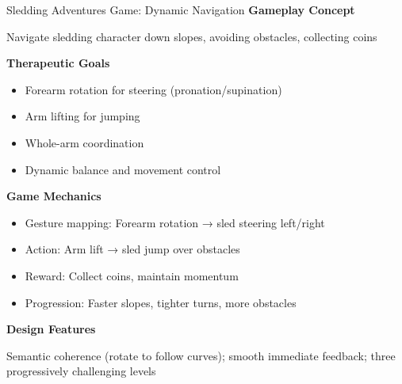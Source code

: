 \begin{frame}{Sledding Adventures Game: Dynamic Navigation}
	\textbf{\textcolor{gbAqua}{Gameplay Concept}}
	
	Navigate sledding character down slopes, avoiding obstacles, collecting coins
	
	\vspace{0.2cm}
	
	\textbf{\textcolor{gbAqua}{Therapeutic Goals}}
	
	\begin{itemize}
		\item Forearm rotation for steering (pronation/supination)
		\item Arm lifting for jumping
		\item Whole-arm coordination
		\item Dynamic balance and movement control
	\end{itemize}
	
	\vspace{0.2cm}
	
	\textbf{\textcolor{gbAqua}{Game Mechanics}}
	
	\begin{itemize}
		\item Gesture mapping: Forearm rotation → sled steering left/right
		\item Action: Arm lift → sled jump over obstacles
		\item Reward: Collect coins, maintain momentum
		\item Progression: Faster slopes, tighter turns, more obstacles
	\end{itemize}
	
	\vspace{0.2cm}
	
	\textbf{\textcolor{gbAqua}{Design Features}}
	
	Semantic coherence (rotate to follow curves); smooth immediate feedback; three progressively challenging levels
\end{frame}

